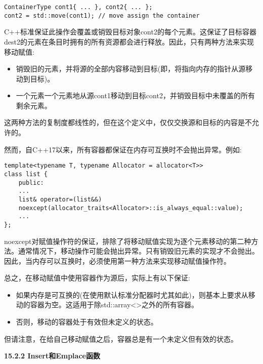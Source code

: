 \begin{lstlisting}[caption={}]
ContainerType cont1{ ... }, cont2{ ... };
cont2 = std::move(cont1); // move assign the container
\end{lstlisting}

C++标准保证此操作会覆盖或销毁目标对象cont2的每个元素。这保证了目标容器dest2的元素在条目时拥有的所有资源都会进行释放。因此，只有两种方法来实现移动赋值:\par

\begin{itemize}
	\item 销毁旧的元素，并将源的全部内容移动到目标(即，将指向内存的指针从源移动到目标)。
	\item 一个元素一个元素地从源cont1移动到目标cont2，并销毁目标中未覆盖的所有剩余元素。
\end{itemize}

这两种方法的复制度都线性的，但在这个定义中，仅仅交换源和目标的内容是不允许的。\par

然而，自C++17以来，所有容器都保证在内存可互换时不会抛出异常。例如:\par

\begin{lstlisting}[caption={}]
template<typename T, typename Allocator = allocator<T>>
class list {
	public:
	...
	list& operator=(list&&)
	noexcept(allocator_traits<Allocator>::is_always_equal::value);
	...
};
\end{lstlisting}

noexcept对赋值操作符的保证，排除了将移动赋值实现为逐个元素移动的第二种方法。通常情况下，移动操作可能会抛出异常。只有销毁旧元素的实现才不会抛出。因此，当内存可以互换时，必须使用第一种方法来实现移动赋值操作符。\par

总之，在移动赋值中使用容器作为源后，实际上有以下保证:\par

\begin{itemize}
	\item 如果内存是可互换的(在使用默认标准分配器时尤其如此)，则基本上要求从移动的容器为空。这适用于除std::array<>之外的所有容器。
	\item 否则，移动的容器处于有效但未定义的状态。
\end{itemize}

但请注意，在给自己移动赋值之后，容器总是有一个未定义但有效的状态。\par

\hspace*{\fill} \par %
\textbf{15.2.2 Insert和Emplace函数}


